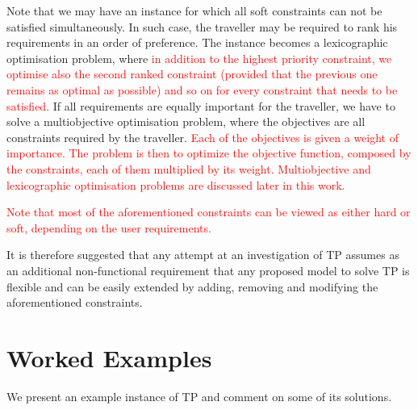 \documentclass{article}
\theoremstyle{definition}
\begin{document}
Note that we may have an instance for which all soft constraints can not be satisfied simultaneously. In such case, the traveller may be required to rank his requirements in an order of preference. The instance becomes a lexicographic optimisation problem, where \textcolor{red}{in addition to the highest priority constraint, we optimise also the second ranked constraint (provided that the previous one remains as optimal as possible) and so on for every constraint that needs to be satisfied.}
If all requirements are equally important for the traveller, we have to solve a multiobjective optimisation problem, where the objectives are all constraints required by the traveller. \textcolor{red}{Each of the objectives is given a weight of importance. The problem is then to optimize the objective function, composed by the constraints, each of them multiplied by its weight. Multiobjective and lexicographic optimisation problems are discussed later in this work.}

\textcolor{red}{Note that most of the aforementioned constraints can be viewed as either hard or soft, depending on the user requirements.}

It is therefore suggested that any attempt at an investigation of TP assumes as an additional non-functional requirement that any proposed model to solve TP is flexible and can be easily extended by adding, removing and modifying the aforementioned constraints.

\section{Worked Examples}
We present an example instance of TP and comment on some of its solutions.
\end{document}
